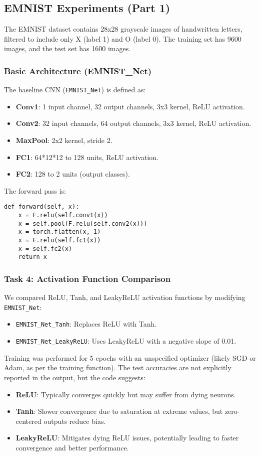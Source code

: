 \documentclass{article}
\begin{document}
\subsection{EMNIST Experiments (Part 1)}
The EMNIST dataset contains 28x28 grayscale images of handwritten letters, filtered to include only X (label 1) and O (label 0). The training set has 9600 images, and the test set has 1600 images.

\subsubsection{Basic Architecture (EMNIST\_Net)}
The baseline CNN (\texttt{EMNIST\_Net}) is defined as:
\begin{itemize}
    \item \textbf{Conv1}: 1 input channel, 32 output channels, 3x3 kernel, ReLU activation.
    \item \textbf{Conv2}: 32 input channels, 64 output channels, 3x3 kernel, ReLU activation.
    \item \textbf{MaxPool}: 2x2 kernel, stride 2.
    \item \textbf{FC1}: 64*12*12 to 128 units, ReLU activation.
    \item \textbf{FC2}: 128 to 2 units (output classes).
\end{itemize}

The forward pass is:
\begin{lstlisting}
def forward(self, x):
    x = F.relu(self.conv1(x))
    x = self.pool(F.relu(self.conv2(x)))
    x = torch.flatten(x, 1)
    x = F.relu(self.fc1(x))
    x = self.fc2(x)
    return x
\end{lstlisting}

\subsubsection{Task 4: Activation Function Comparison}
We compared ReLU, Tanh, and LeakyReLU activation functions by modifying \texttt{EMNIST\_Net}:
\begin{itemize}
    \item \texttt{EMNIST\_Net\_Tanh}: Replaces ReLU with Tanh.
    \item \texttt{EMNIST\_Net\_LeakyReLU}: Uses LeakyReLU with a negative slope of 0.01.
\end{itemize}

Training was performed for 5 epochs with an unspecified optimizer (likely SGD or Adam, as per the training function). The test accuracies are not explicitly reported in the output, but the code suggests:
\begin{itemize}
    \item \textbf{ReLU}: Typically converges quickly but may suffer from dying neurons.
    \item \textbf{Tanh}: Slower convergence due to saturation at extreme values, but zero-centered outputs reduce bias.
    \item \textbf{LeakyReLU}: Mitigates dying ReLU issues, potentially leading to faster convergence and better performance.
\end{itemize}
\end{document}

